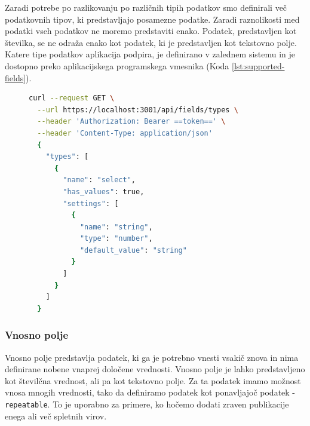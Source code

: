 \documentclass[a4paper, 12pt]{book}
\begin{document}
Zaradi potrebe po razlikovanju po različnih tipih podatkov smo definirali več podatkovnih tipov, ki predstavljajo posamezne podatke. Zaradi raznolikosti med podatki vseh podatkov ne moremo predstaviti enako. Podatek, predstavljen kot številka, se ne odraža enako kot podatek, ki je predstavljen kot tekstovno polje. Katere tipe podatkov aplikacija podpira, je definirano v zalednem sistemu in je dostopno preko aplikacijskega programskega vmesnika (Koda \ref{lst:supported-fields}).

\begin{figure}[h]
\centering
\begin{lstlisting}[language=bash, style=mystyle,caption={Izsek aplikacijskega vmesnika za pridobitev vseh podprtih podatkovnih tipov v aplikaciji.},label=lst:supported-fields]
curl --request GET \
  --url https://localhost:3001/api/fields/types \
  --header 'Authorization: Bearer ==token==' \
  --header 'Content-Type: application/json'
  {
    "types": [
      {
        "name": "select",
        "has_values": true,
        "settings": [
          {
            "name": "string",
            "type": "number",
            "default_value": "string"
          }
        ]
      }
    ]
  }
\end{lstlisting}
\end{figure}



\subsubsection{Vnosno polje}
Vnosno polje predstavlja podatek, ki ga je potrebno vnesti vsakič znova in nima definirane nobene vnaprej določene vrednosti. Vnosno polje je lahko predstavljeno kot številčna vrednost, ali pa kot tekstovno polje.
Za ta podatek imamo možnost vnosa mnogih vrednosti, tako da definiramo podatek kot ponavljajoč podatek - \verb=repeatable=. To je uporabno za primere, ko hočemo dodati zraven publikacije enega ali več spletnih virov.
\end{document}
